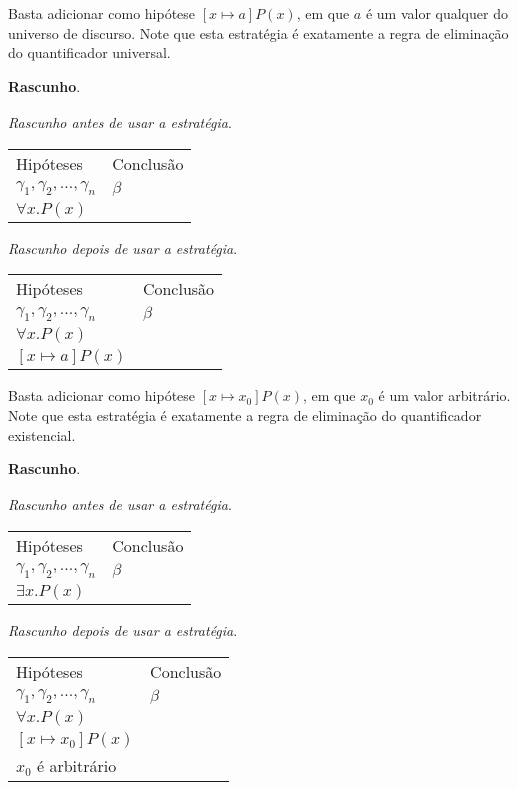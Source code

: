 \begin{HypothesisStrategy}
Basta adicionar como hipótese $[x\mapsto a]P(x)$, em que $a$ é um
valor qualquer do universo de discurso. Note que esta estratégia é exatamente a regra de
eliminação do quantificador universal.
\begin{flushleft}
 \textbf{Rascunho}.\\
\verb| |\\

\textit{Rascunho antes de usar a estratégia}.
\verb| |\\
\begin{tabular}{ll}
Hipóteses & Conclusão \\
$\gamma_1,\gamma_2,...,\gamma_n$ & $\beta$\\
$\forall x. P(x)$ & \\
\end{tabular}

\textit{Rascunho depois de usar a estratégia}.
\verb| |\\
\begin{tabular}{ll}
Hipóteses & Conclusão \\
$\gamma_1,\gamma_2,...,\gamma_n$ & $\beta$\\
$\forall x. P(x)$ & \\
$[x\mapsto a]P(x)$ & \\
\end{tabular}
\end{flushleft}
\end{HypothesisStrategy}

\begin{HypothesisStrategy}
Basta adicionar como hipótese $[x\mapsto x_0]P(x)$, em que $x_0$ é um
valor arbitrário. Note que esta estratégia é exatamente a regra de
eliminação do quantificador existencial.
\begin{flushleft}
 \textbf{Rascunho}.\\
\verb| |\\

\textit{Rascunho antes de usar a estratégia}.
\verb| |\\
\begin{tabular}{ll}
Hipóteses & Conclusão \\
$\gamma_1,\gamma_2,...,\gamma_n$ & $\beta$\\
$\exists x. P(x)$ & \\
\end{tabular}

\textit{Rascunho depois de usar a estratégia}.
\verb| |\\
\begin{tabular}{ll}
Hipóteses & Conclusão \\
$\gamma_1,\gamma_2,...,\gamma_n$ & $\beta$\\
$\forall x. P(x)$ & \\
$[x\mapsto x_0]P(x)$ & \\
$x_0$ é arbitrário & \\
\end{tabular}
\end{flushleft}
\end{HypothesisStrategy}

